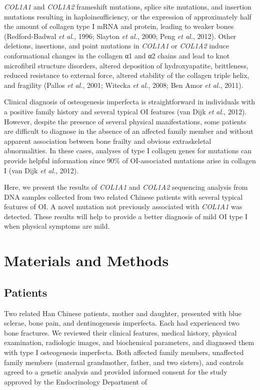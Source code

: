 \textit{COL1A1} and \textit{COL1A2} frameshift mutations, splice site mutations, and insertion mutations resulting in haploinsufficiency, or the expression of approximately half the amount of collagen type I mRNA and protein, leading to weaker bones (Redford-Badwal \textit{et al.}, 1996; Slayton \textit{et al.}, 2000; Peng \textit{et al.}, 2012). Other deletions, insertions, and point mutations in \textit{COL1A1} or \textit{COL1A2} induce conformational changes in the collagen α1 and α2 chains and lead to knot microfibril structure disorders, altered deposition of hydroxyapatite, brittleness, reduced resistance to external force, altered stability of the collagen triple helix, and fragility (Pallos \textit{et al.}, 2001; Witecka \textit{et al.}, 2008; Ben Amor \textit{et al.}, 2011).\par Clinical diagnosis of osteogenesis imperfecta is straightforward in individuals with a positive family history and several typical OI features (van Dijk \textit{et al.}, 2012). However, despite the presence of several physical manifestations, some patients are difficult to diagnose in the absence of an affected family member and without apparent association between bone frailty and obvious extraskeletal abnormalities. In these cases, analyses of type I collagen genes for mutations can provide helpful information since 90\% of OI-associated mutations arise in collagen I (van Dijk \textit{et al.}, 2012).\par Here, we present the results of \textit{COL1A1} and \textit{COL1A2} sequencing analysis from DNA samples collected from two related Chinese patients with several typical features of OI. A novel mutation not previously associated with \textit{COL1A1} was detected. These results will help to provide a better diagnosis of mild OI type I when physical symptoms are mild.\section*{Materials and Methods}\subsection*{Patients}\par Two related Han Chinese patients, mother and daughter, presented with blue sclerae, bone pain, and dentinogenesis imperfecta. Each had experienced two bone fractures. We reviewed their clinical features, medical history, physical examination, radiologic images, and biochemical parameters, and diagnosed them with type I osteogenesis imperfecta. Both affected family members, unaffected family members (maternal grandmother, father, and two sisters), and controls agreed to a genetic analysis and provided informed consent for the study approved by the Endocrinology Department of 